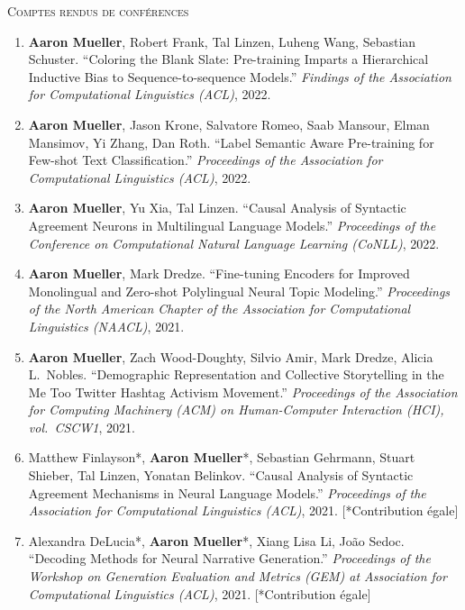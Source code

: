 \documentclass[10pt]{article}
\begin{document}
	\textsc{Comptes rendus de conférences}
	\begin{enumerate}[leftmargin=*, topsep=0pt, itemsep=-1ex, partopsep=0ex, parsep=1ex]
	\item \textbf{Aaron Mueller}, Robert Frank, Tal Linzen, Luheng Wang, Sebastian Schuster. ``Coloring the Blank Slate: Pre-training Imparts a Hierarchical Inductive Bias to Sequence-to-sequence Models.'' \emph{Findings of the Association for Computational Linguistics (ACL)}, 2022.

	\item \textbf{Aaron Mueller}, Jason Krone, Salvatore Romeo, Saab Mansour, Elman Mansimov, Yi Zhang, Dan Roth. ``Label Semantic Aware Pre-training for Few-shot Text Classification.'' \emph{Proceedings of the Association for Computational Linguistics (ACL)}, 2022.
	
	\item \textbf{Aaron Mueller}, Yu Xia, Tal Linzen. ``Causal Analysis of Syntactic Agreement Neurons in Multilingual Language Models.'' \emph{Proceedings of the Conference on Computational Natural Language Learning (CoNLL)}, 2022.
			
	\item \textbf{Aaron Mueller}, Mark Dredze. ``Fine-tuning Encoders for Improved Monolingual and Zero-shot Polylingual Neural Topic Modeling.'' \emph{Proceedings of the North American Chapter of the Association for Computational Linguistics (NAACL)}, 2021.  
	
	\item \textbf{Aaron Mueller}, Zach Wood-Doughty, Silvio Amir, Mark Dredze, Alicia L.\ Nobles. ``Demographic Representation and Collective Storytelling in the Me Too Twitter Hashtag Activism Movement.'' \emph{Proceedings of the Association for Computing Machinery (ACM) on Human-Computer Interaction (HCI), vol.\ CSCW1}, 2021.

	\item Matthew Finlayson*, \textbf{Aaron Mueller}*, Sebastian Gehrmann, Stuart Shieber, Tal Linzen, Yonatan Belinkov. ``Causal Analysis of Syntactic Agreement Mechanisms in Neural Language Models.'' \emph{Proceedings of the Association for Computational Linguistics (ACL)}, 2021. [*Contribution égale]
	
	\item Alexandra DeLucia*, \textbf{Aaron Mueller}*, Xiang Lisa Li, João Sedoc. ``Decoding Methods for Neural Narrative Generation.'' \emph{Proceedings of the Workshop on Generation Evaluation and Metrics (GEM) at Association for Computational Linguistics (ACL)}, 2021. [*Contribution égale]


\end{enumerate}
\end{document}
